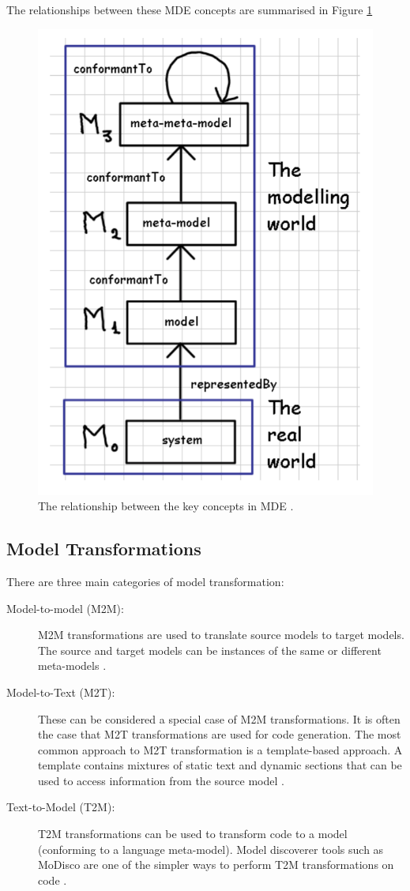 \documentclass{UoYCSproject}
\begin{document}
The relationships between these MDE concepts are summarised in Figure \ref{fig:metamodel_term}

\begin{figure}[h!]
  \centering
  \includegraphics[width=0.4\linewidth]{graphics/metamodel_terminology.png}
  \caption{The relationship between the key concepts in MDE \parencite{bezivin2004search}.}
  \label{fig:metamodel_term}
\end{figure}


\subsection{Model Transformations}
There are three main categories of model transformation:
\begin{description}
\item[Model-to-model (M2M):] M2M transformations are used to translate source models to target models. The source and target models can be instances of the same or different meta-models \parencite{czarnecki2003classification}.
\item[Model-to-Text (M2T):] These can be considered a special case of M2M transformations. It is often the case that M2T transformations are used for code generation. The most common approach to M2T transformation is a template-based approach. A template contains mixtures of static text and dynamic sections that can be used to access information from the source model \parencite{czarnecki2003classification}.
\item[Text-to-Model (T2M):]  T2M transformations can be used to transform code to a model (conforming to a language meta-model). Model discoverer tools such as MoDisco \parencite{bruneliere2014modisco} are one of the simpler ways to perform T2M transformations on code \parencite{kowalczyk2009model}.
\end{description}
\end{document}
